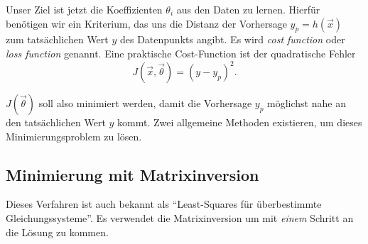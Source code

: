 Unser Ziel ist jetzt die Koeffizienten $\theta_i$ aus den Daten zu lernen. Hierfür
benötigen wir ein Kriterium, das uns die Distanz der Vorhersage $y_p = h(\vec x)$ zum tatsächlichen
Wert $y$ des Datenpunkts angibt. Es wird \emph{cost function} oder
%
\emph{loss function} genannt.
Eine praktische Cost-Function ist der quadratische Fehler
%
\begin{equation}
J(\vec x, \vec \theta) = (y - y_p)^2.
\label{ml:regression:cost:sqerr}
\end{equation}

$J(\vec \theta)$ soll also minimiert werden, damit die Vorhersage $y_p$ möglichst nahe an den
tatsächlichen Wert $y$ kommt. Zwei allgemeine Methoden existieren, um dieses
Minimierungsproblem zu lösen.

\subsection{Minimierung mit Matrixinversion}

Dieses Verfahren ist auch bekannt als ``Least-Squares für überbestimmte
Gleichungssysteme''. Es verwendet die Matrixinversion um mit \emph{einem} Schritt an die
Lösung zu kommen.

